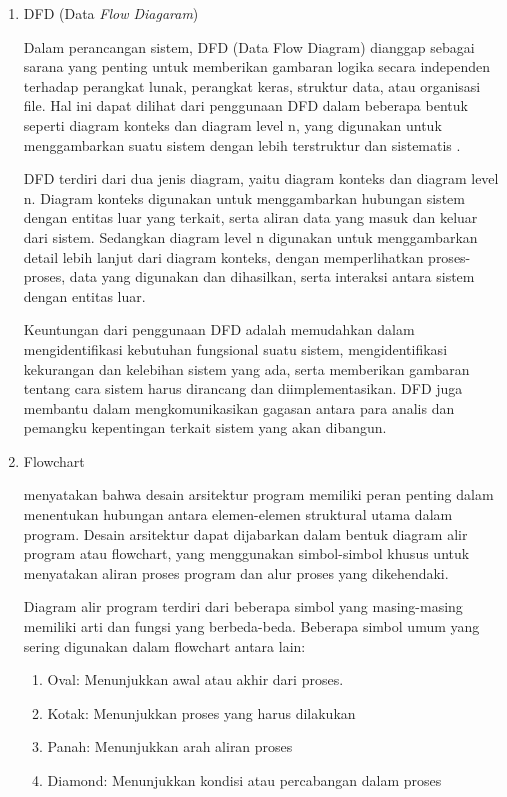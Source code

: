 \begin{enumerate}[leftmargin=1cm, itemindent=0.6cm,labelwidth=15pt, labelsep=5pt, listparindent=1cm,align=left]

	\item DFD (Data \textit{Flow Diagaram})

	      Dalam perancangan sistem, DFD (Data Flow Diagram) dianggap sebagai sarana yang penting untuk memberikan gambaran logika secara independen terhadap perangkat lunak, perangkat keras, struktur data, atau organisasi file. Hal ini dapat dilihat dari penggunaan DFD dalam beberapa bentuk seperti diagram konteks dan diagram level n, yang digunakan untuk menggambarkan suatu sistem dengan lebih terstruktur dan sistematis \textcite{khotijah2016perancangan}.

	      DFD terdiri dari dua jenis diagram, yaitu diagram konteks dan diagram level n. Diagram konteks digunakan untuk menggambarkan hubungan sistem dengan entitas luar yang terkait, serta aliran data yang masuk dan keluar dari sistem. Sedangkan diagram level n digunakan untuk menggambarkan detail lebih lanjut dari diagram konteks, dengan memperlihatkan proses-proses, data yang digunakan dan dihasilkan, serta interaksi antara sistem dengan entitas luar.

	      Keuntungan dari penggunaan DFD adalah memudahkan dalam mengidentifikasi kebutuhan fungsional suatu sistem, mengidentifikasi kekurangan dan kelebihan sistem yang ada, serta memberikan gambaran tentang cara sistem harus dirancang dan diimplementasikan. DFD juga membantu dalam mengkomunikasikan gagasan antara para analis dan pemangku kepentingan terkait sistem yang akan dibangun.

	\item Flowchart

	      menyatakan bahwa desain arsitektur program memiliki peran penting dalam menentukan hubungan antara elemen-elemen struktural utama dalam program. Desain arsitektur dapat dijabarkan dalam bentuk diagram alir program atau flowchart, yang menggunakan simbol-simbol khusus untuk menyatakan aliran proses program dan alur proses yang dikehendaki.

	      Diagram alir program terdiri dari beberapa simbol yang masing-masing memiliki arti dan fungsi yang berbeda-beda. Beberapa simbol umum yang sering digunakan dalam flowchart antara lain:

	      \begin{enumerate}
		      \item Oval: Menunjukkan awal atau akhir dari proses.
		      \item Kotak: Menunjukkan proses yang harus dilakukan
		      \item Panah: Menunjukkan arah aliran proses
		      \item Diamond: Menunjukkan kondisi atau percabangan dalam proses
	      \end{enumerate}


\end{enumerate}

